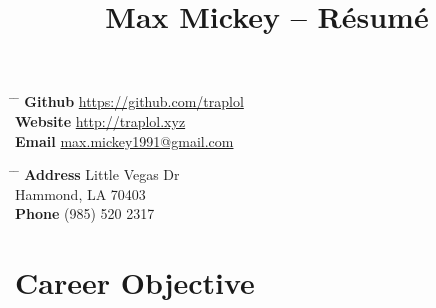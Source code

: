 \documentclass[10pt]{article} %
\begin{document}

\title{Max Mickey -- Résumé}


\parbox{0.5\textwidth}{ %
\begin{tabbing}
\hspace{2cm} \= \hspace{3cm} \= \kill 
\textbf {Github} \> \href{https://github.com/traplol}{https://github.com/traplol} \\
\textbf {Website} \> \href{http://traplol.xyz}{http://traplol.xyz} \\
\textbf {Email} \> \href{mailto:max.mickey1991@gmail.com}{max.mickey1991@gmail.com} \\
\end{tabbing}}
\hfill
\parbox{0.5\textwidth}{ %
\begin{tabbing}
\hspace{2cm} \= \hspace{3cm} \= \kill
\textbf {Address}  Little Vegas Dr\\ %
\> Hammond, LA 70403 \\ %
\textbf {Phone} \> (985) 520 2317 \\
\end{tabbing}}

\vspace{-10mm}
%
%
\section{Career Objective}
\vspace{-3mm}
\end{document}
